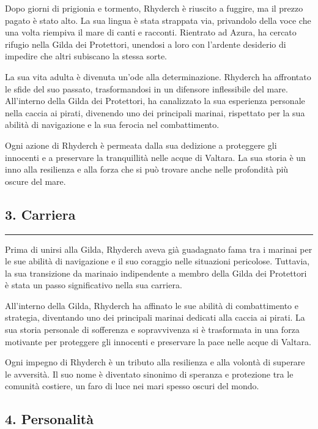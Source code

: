 Dopo giorni di prigionia e tormento, Rhyderch è riuscito a fuggire, ma
il prezzo pagato è stato alto. La sua lingua è stata strappata via,
privandolo della voce che una volta riempiva il mare di canti e
racconti. Rientrato ad Azura, ha cercato rifugio nella Gilda dei
Protettori, unendosi a loro con l'ardente desiderio di impedire che
altri subiscano la stessa sorte.

La sua vita adulta è divenuta un'ode alla determinazione. Rhyderch ha
affrontato le sfide del suo passato, trasformandosi in un difensore
inflessibile del mare. All'interno della Gilda dei Protettori, ha
canalizzato la sua esperienza personale nella caccia ai pirati,
divenendo uno dei principali marinai, rispettato per la sua abilità di
navigazione e la sua ferocia nel combattimento.

Ogni azione di Rhyderch è permeata dalla sua dedizione a proteggere gli
innocenti e a preservare la tranquillità nelle acque di Valtara. La sua
storia è un inno alla resilienza e alla forza che si può trovare anche
nelle profondità più oscure del mare.

\subsection{3. Carriera}\label{carriera}

\begin{center}\rule{0.5\linewidth}{0.5pt}\end{center}

Prima di unirsi alla Gilda, Rhyderch aveva già guadagnato fama tra i
marinai per le sue abilità di navigazione e il suo coraggio nelle
situazioni pericolose. Tuttavia, la sua transizione da marinaio
indipendente a membro della Gilda dei Protettori è stata un passo
significativo nella sua carriera.

All'interno della Gilda, Rhyderch ha affinato le sue abilità di
combattimento e strategia, diventando uno dei principali marinai
dedicati alla caccia ai pirati. La sua storia personale di sofferenza e
sopravvivenza si è trasformata in una forza motivante per proteggere gli
innocenti e preservare la pace nelle acque di Valtara.

Ogni impegno di Rhyderch è un tributo alla resilienza e alla volontà di
superare le avversità. Il suo nome è diventato sinonimo di speranza e
protezione tra le comunità costiere, un faro di luce nei mari spesso
oscuri del mondo.

\subsection{4. Personalità}\label{personalituxe0}


